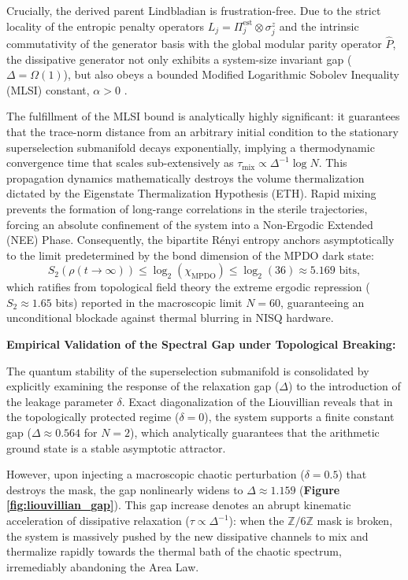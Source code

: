 \documentclass[12pt,a4paper]{article}
\theoremstyle{plain}
\theoremstyle{definition}
\theoremstyle{remark}
\begin{document}
Crucially, the derived parent Lindbladian is frustration-free. Due to the strict locality of the entropic penalty operators $L_j = \Pi_j^{\text{est}} \otimes \sigma_j^z$ and the intrinsic commutativity of the generator basis with the global modular parity operator $\hat{P}$, the dissipative generator not only exhibits a system-size invariant gap ($\Delta = \Omega(1)$), but also obeys a bounded Modified Logarithmic Sobolev Inequality (MLSI) constant, $\alpha > 0$ \cite{Kastoryano2013}.

The fulfillment of the MLSI bound is analytically highly significant: it guarantees that the trace-norm distance from an arbitrary initial condition to the stationary superselection submanifold decays exponentially, implying a thermodynamic convergence time that scales sub-extensively as $\tau_{\text{mix}} \propto \Delta^{-1} \log N$.
This propagation dynamics mathematically destroys the volume thermalization dictated by the Eigenstate Thermalization Hypothesis (ETH). Rapid mixing prevents the formation of long-range correlations in the sterile trajectories, forcing an absolute confinement of the system into a Non-Ergodic Extended (NEE) Phase. Consequently, the bipartite Rényi entropy anchors asymptotically to the limit predetermined by the bond dimension of the MPDO dark state:
\begin{equation}
S_2(\rho(t \to \infty)) \le \log_2(\chi_{\text{MPDO}}) \le \log_2(36) \approx 5.169 \text{ bits},
\end{equation}
which ratifies from topological field theory the extreme ergodic repression ($S_2 \approx 1.65$ bits) reported in the macroscopic limit $N=60$, guaranteeing an unconditional blockade against thermal blurring in NISQ hardware.

\textbf{Empirical Validation of the Spectral Gap under Topological Breaking:}

The quantum stability of the superselection submanifold is consolidated by explicitly examining the response of the relaxation gap ($\Delta$) to the introduction of the leakage parameter $\delta$. Exact diagonalization of the Liouvillian reveals that in the topologically protected regime ($\delta = 0$), the system supports a finite constant gap ($\Delta \approx 0.564$ for $N=2$), which analytically guarantees that the arithmetic ground state is a stable asymptotic attractor.

However, upon injecting a macroscopic chaotic perturbation ($\delta = 0.5$) that destroys the mask, the gap nonlinearly widens to $\Delta \approx 1.159$ (\textbf{Figure \ref{fig:liouvillian_gap}}). This gap increase denotes an abrupt kinematic acceleration of dissipative relaxation ($\tau \propto \Delta^{-1}$): when the $\mathbb{Z}/6\mathbb{Z}$ mask is broken, the system is massively pushed by the new dissipative channels to mix and thermalize rapidly towards the thermal bath of the chaotic spectrum, irremediably abandoning the Area Law.
\end{document}
